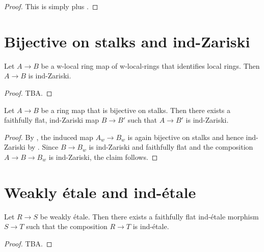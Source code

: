 \begin{proof}
    This is simply  plus
    .
\end{proof}

\section{Bijective on stalks and ind-Zariski}

\begin{lemma}[\stacksproject{097F}]
    Let $A \to B$ be a w-local ring map of w-local-rings that identifies local rings. Then
    $A \to B$ is ind-Zariski.
    \label{lemma:w-local-bijective-on-stalks-ind-zariski}
    \leanok
\end{lemma}

\begin{proof}
    TBA.
\end{proof}

\begin{proposition}[\stacksproject{097G}]
    Let $A \to B$ be a ring map that is bijective on stalks. Then there exists a faithfully flat,
    ind-Zariski map $B \to B'$ such that $A \to B'$ is ind-Zariski.
    \label{prop:bijective-on-stalks-ind-zariski}
    \leanok
\end{proposition}

\begin{proof}
    By , the induced map $A_w \to B_w$ is again
    bijective on stalks and hence ind-Zariski by .
    Since $B \to B_w$ is ind-Zariski and faithfully flat and the composition $A \to B \to B_w$ is ind-Zariski,
    the claim follows.
\end{proof}

\section{Weakly étale and ind-étale}

\begin{theorem}
    Let $R \to S$ be weakly étale. Then there exists a faithfully flat ind-étale morphism
    $S \to T$ such that the composition $R \to T$ is ind-étale.
    \label{thm:weakly-etale-ind-etale}
    \leanok
\end{theorem}

\begin{proof}
    TBA.
\end{proof}
